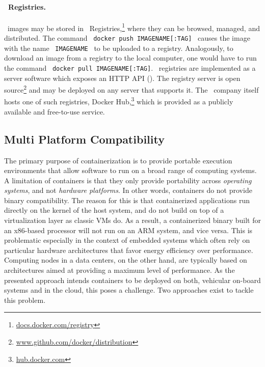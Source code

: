 \paragraph{\docker\ Registries.}
\docker\ images may be stored in \docker\ Registries,\footnote{\url{docs.docker.com/registry}} where they can be browsed, managed, and distributed. The command \ \mbox{\texttt{docker push IMAGENAME[:TAG]}} \ causes the image with the name \ \mbox{\texttt{IMAGENAME}} \ to be uploaded to a registry. Analogously, to download an image from a registry to the local computer, one would have to run the command \ \mbox{\texttt{docker pull IMAGENAME[:TAG]}}. \docker\ registries are implemented as a server software which exposes an HTTP API (\cf {}). The registry server is open source\footnote{\url{www.github.com/docker/distribution}} and may be deployed on any server that supports it. The \docker\ company itself hosts one of such registries, Docker Hub,\footnote{\url{hub.docker.com}} which is provided as a publicly available  and free-to-use service.

\subsection{Multi Platform Compatibility} \label{sec:multiplat}
The primary purpose of containerization is to provide portable execution environments that allow software to run on a broad range of computing systems. A limitation of containers is that they only provide portability across \emph{operating systems}, and not \emph{hardware platforms}. In other words, containers do not provide binary compatibility. The reason for this is that containerized applications run directly on the kernel of the host system, and do not build on top of a virtualization layer as classic VMs do. As a result, a containerized binary built for an x86-based processor will not run on an ARM system, and vice versa. This is problematic especially in the context of embedded systems which often rely on particular hardware architectures that favor energy efficiency over performance. Computing nodes in a data centers, on the other hand, are typically based on architectures aimed at providing a maximum level of performance. As the presented approach intends containers to be deployed on both, vehicular on-board systems and in the cloud, this poses a challenge. Two approaches exist to tackle this problem.

